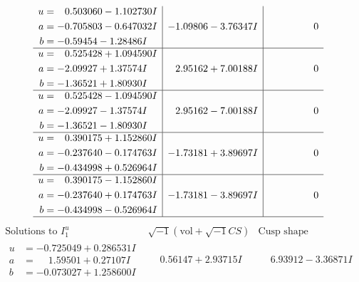 \documentclass[1p]{elsarticle_modified}
\theoremstyle{definition}
\newcommand{\I}{\sqrt{-1}}
\begin{document}
$$\begin{array}{c|c|c}
\begin{aligned}
u &= \phantom{-}0.503060 - 1.102730 I \\
a &= -0.705803 - 0.647032 I \\
b &= -0.59454 - 1.28486 I\end{aligned}
 & -1.09806 - 3.76347 I & \phantom{-0.000000 } 0 \\ \hline\begin{aligned}
u &= \phantom{-}0.525428 + 1.094590 I \\
a &= -2.09927 + 1.37574 I \\
b &= -1.36521 + 1.80930 I\end{aligned}
 & \phantom{-}2.95162 + 7.00188 I & \phantom{-0.000000 } 0 \\ \hline\begin{aligned}
u &= \phantom{-}0.525428 - 1.094590 I \\
a &= -2.09927 - 1.37574 I \\
b &= -1.36521 - 1.80930 I\end{aligned}
 & \phantom{-}2.95162 - 7.00188 I & \phantom{-0.000000 } 0 \\ \hline\begin{aligned}
u &= \phantom{-}0.390175 + 1.152860 I \\
a &= -0.237640 - 0.174763 I \\
b &= -0.434998 + 0.526964 I\end{aligned}
 & -1.73181 + 3.89697 I & \phantom{-0.000000 } 0 \\ \hline\begin{aligned}
u &= \phantom{-}0.390175 - 1.152860 I \\
a &= -0.237640 + 0.174763 I \\
b &= -0.434998 - 0.526964 I\end{aligned}
 & -1.73181 - 3.89697 I & \phantom{-0.000000 } 0\\
 \hline 
 \end{array}$$\newpage$$\begin{array}{c|c|c}  
\text{Solutions to }I^u_{1}& \I (\text{vol} + \sqrt{-1}CS) & \text{Cusp shape}\\
 \hline 
\begin{aligned}
u &= -0.725049 + 0.286531 I \\
a &= \phantom{-}1.59501 + 0.27107 I \\
b &= -0.073027 + 1.258600 I\end{aligned}
 & \phantom{-}0.56147 + 2.93715 I & \phantom{-}6.93912 - 3.36871 I \\ \hline\begin{aligned}

\end{aligned}
\end{array}$$
\end{document}
